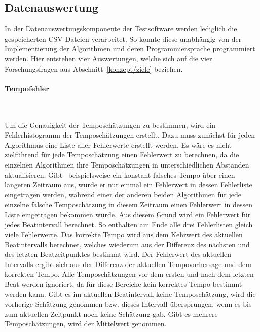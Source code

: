{	\subsection{Datenauswertung}
	{
		In der Datenauswertungskomponente der Testsoftware werden lediglich die gespeicherten \acs{CSV}-Dateien verarbeitet.
		So konnte diese unabhängig von der Implementierung der Algorithmen und deren Programmiersprache programmiert werden.
		Hier entstehen vier Auswertungen,
			welche sich auf die vier Forschungsfragen aus Abschnitt~\ref{konzept/ziele} beziehen.

		\paragraph{\large Tempofehler} \mbox{}\vspace{3mm}\\
		{
			Um die Genauigkeit der Temposchätzungen zu bestimmen,
				wird ein Fehlerhistogramm der Temposchätzungen erstellt.
			Dazu muss zunächst für jeden Algorithmus eine Liste aller Fehlerwerte erstellt werden.
			Es wäre es nicht zielführend für jede Temposchätzung einen Fehlerwert zu berechnen,
				da die einzelnen Algorithmen ihre Temposchätzungen in unterschiedlichen Abständen aktualisieren.
			Gibt~\cite{2011_PlRoSt} beispielsweise ein konstant falsches Tempo über einen längeren Zeitraum aus,
				würde er nur einmal ein Fehlerwert in dessen Fehlerliste eingetragen werden,
				während einer der anderen beiden Algorithmen
				für jede einzelne falsche Temposchätzung in diesem Zeitraum
				einen Fehlerwert in dessen Liste eingetragen bekommen würde.
			Aus diesem Grund wird ein Fehlerwert für jedes Beatintervall berechnet.
			So enthalten am Ende alle drei Fehlerlisten gleich viele Fehlerwerte.
			Das korrekte Tempo wird aus dem Kehrwert des aktuellen Beatintervalls berechnet,
				welches wiederum aus der Differenz des nächsten und des letzten Beatzeitpunktes bestimmt wird.
			Der Fehlerwert des aktuellen Intervalls ergibt sich aus der Differenz der aktuellen Tempovorhersage und dem korrekten Tempo.
			Alle Temposchätzungen vor dem ersten und nach dem letzten Beat werden ignoriert,
				da für diese Bereiche kein korrektes Tempo bestimmt werden kann.
			Gibt es im aktuellen Beatintervall keine Temposchätzung,
				wird die vorherige Schätzung genommen
				bzw. dieses Intervall übersprungen,
				wenn es bis zum aktuellen Zeitpunkt noch keine Schätzung gab.
			Gibt es mehrere Temposchätzungen,
				wird der Mittelwert genommen.

}}}
